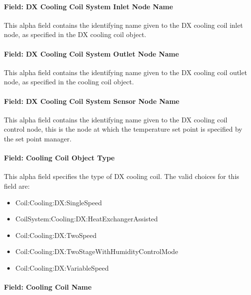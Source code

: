 \paragraph{Field: DX Cooling Coil System Inlet Node Name}\label{field-dx-cooling-coil-system-inlet-node-name}

This alpha field contains the identifying name given to the DX cooling coil inlet node, as specified in the DX cooling coil object.

\paragraph{Field: DX Cooling Coil System Outlet Node Name}\label{field-dx-cooling-coil-system-outlet-node-name}

This alpha field contains the identifying name given to the DX cooling coil outlet node, as specified in the cooling coil object.

\paragraph{Field: DX Cooling Coil System Sensor Node Name}\label{field-dx-cooling-coil-system-sensor-node-name}

This alpha field contains the identifying name given to the DX cooling coil control node, this is the node at which the temperature set point is specified by the set point manager.

\paragraph{Field: Cooling Coil Object Type}\label{field-cooling-coil-object-type-000}

This alpha field specifies the type of DX cooling coil. The valid choices for this field are:

\begin{itemize}
\item
  Coil:Cooling:DX:SingleSpeed
\item
  CoilSystem:Cooling:DX:HeatExchangerAssisted
\item
  Coil:Cooling:DX:TwoSpeed
\item
  Coil:Cooling:DX:TwoStageWithHumidityControlMode
\item
  Coil:Cooling:DX:VariableSpeed
\end{itemize}

\paragraph{Field: Cooling Coil Name}\label{field-cooling-coil-name-000}

